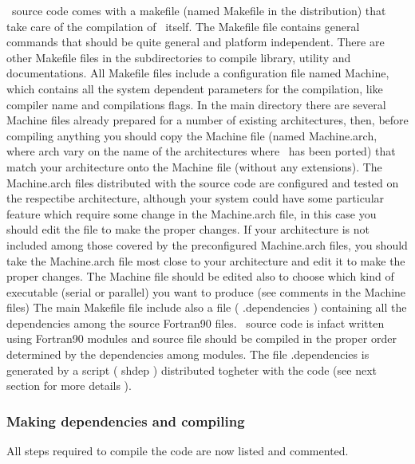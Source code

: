 \PDAC\ source code comes with a makefile (named Makefile in the distribution)
that take care of the compilation of \PDAC\ itself.
The Makefile file contains general commands that should be quite general
and platform independent. There are other Makefile files in the 
subdirectories to compile library, utility and documentations.
All Makefile files include a configuration file named Machine,
which contains all the system dependent parameters for the compilation,
like compiler name and compilations flags.
In the main directory there are several Machine files already prepared
for a number of existing architectures, then, before compiling anything
you should copy the Machine file (named Machine.arch, where arch vary 
on the name of the architectures where \PDAC\ has been ported) that match your 
architecture onto the Machine file (without any extensions).
The Machine.arch files distributed with the source code
are configured and tested on the respectibe architecture, although your system
could have some particular feature which require some change in the 
Machine.arch file, in this case you should edit the file to make the
proper changes. If your architecture is not included among those covered
by the preconfigured Machine.arch files, you should take the Machine.arch
file most close to your architecture and edit it to make the proper changes.
The Machine file should be edited also to choose which kind of executable
(serial or parallel) you want to produce (see comments in the Machine files)
The main Makefile file include also a file ( .dependencies ) containing
all the dependencies among the source Fortran90 files. \PDAC\ source code 
is infact written using Fortran90 modules and source file
should be compiled in the proper order determined by the dependencies
among modules. The file .dependencies is generated by a script ( shdep )
distributed togheter with the code (see next section for more details ).

\subsubsection{Making dependencies and compiling}

All steps required to compile the code are now listed and commented.

